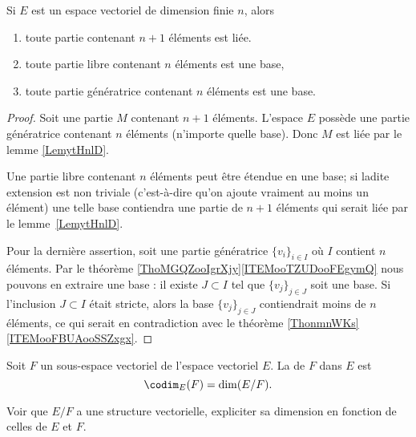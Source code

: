 \begin{proposition}     \label{PROPooVEVCooHkrldw}
	Si \( E\) est un espace vectoriel de dimension finie \( n\), alors
	\begin{enumerate}
		\item       \label{ITEMooZNLDooBISkJyBS}
		      toute partie contenant \( n+1\) éléments est liée.
		\item       \label{ITEMooSGGCooOUsuBs}
		      toute partie libre contenant \( n\) éléments est une base,
		\item
		      toute partie génératrice contenant \( n\) éléments est une base.
	\end{enumerate}
\end{proposition}

\begin{proof}
	Soit une partie \( M\) contenant \( n+1\) éléments. L'espace \( E\) possède une partie génératrice contenant \( n\) éléments (n'importe quelle base). Donc \( M\) est liée par le lemme \ref{LemytHnlD}.

	Une partie libre contenant \( n\) éléments peut être étendue en une base; si ladite extension est non triviale (c'est-à-dire qu'on ajoute vraiment au moins un élément) une telle base contiendra une partie de \( n+1\) éléments qui serait liée par le lemme~\ref{LemytHnlD}.

	Pour la dernière assertion, soit une partie génératrice \( \{ v_i \}_{i\in I}\) où \( I\) contient \( n\) éléments. Par le théorème \ref{ThoMGQZooIgrXjy}\ref{ITEMooTZUDooFEgymQ} nous pouvons en extraire une base : il existe \( J\subset I\) tel que \( \{ v_j \}_{j\in J}\) soit une base. Si l'inclusion \( J\subset I\) était stricte, alors la base \( \{ v_j \}_{j\in J}\) contiendrait moins de \( n\) éléments, ce qui serait en contradiction avec le théorème \ref{ThonmnWKs}\ref{ITEMooFBUAooSSZxgx}.
\end{proof}

\begin{definition}\label{DefCodimension}
	Soit \( F\) un sous-espace vectoriel de l'espace vectoriel \( E\). La  de \( F\) dans \( E\) est
	\begin{equation}
		\codim_E(F)=\dim(E/F).
	\end{equation}
\end{definition}

\begin{probleme}
	Voir que $E/F$ a une structure vectorielle, expliciter sa dimension en fonction de celles de $E$ et $F$.
\end{probleme}

